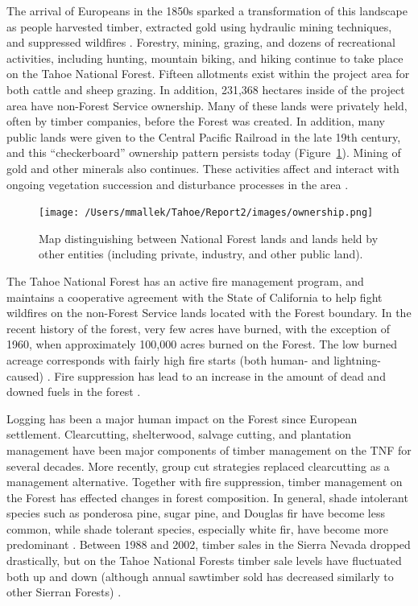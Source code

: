 The arrival of Europeans in the 1850s sparked a transformation of this landscape as people harvested timber, extracted gold using hydraulic mining techniques, and suppressed wildfires \citep{Storer1963}. Forestry, mining, grazing, and dozens of recreational activities, including hunting, mountain biking, and hiking continue to take place on the Tahoe National Forest. Fifteen allotments exist within the project area for both cattle and sheep grazing. In addition, 231,368 hectares inside of the project area have non-Forest Service ownership. Many of these lands were privately held, often by timber companies, before the Forest was created. In addition, many public lands were given to the Central Pacific Railroad in the late 19th century, and this ``checkerboard'' ownership pattern persists today (Figure~\ref{ownership}). Mining of gold and other minerals also continues. These activities affect and interact with ongoing vegetation succession and disturbance processes in the area \citep{USDAForestService2014}.

\begin{figure}[!htbp]
\centering
\texttt{[image: /Users/mmallek/Tahoe/Report2/images/ownership.png]}
\caption{Map distinguishing between National Forest lands and lands held by other entities (including private, industry, and other public land).} 
\label{ownership}
\end{figure}

The Tahoe National Forest has an active fire management program, and maintains a cooperative agreement with the State of California to help fight wildfires on the non-Forest Service lands located with the Forest boundary. In the recent history of the forest, very few acres have burned, with the exception of 1960, when approximately 100,000 acres burned on the Forest. The low burned acreage corresponds with fairly high fire starts (both human- and lightning-caused) \citep{USDAForestService1990}. Fire suppression has lead to an increase in the amount of dead and downed fuels in the forest \citep{USDAForestService2004}.

Logging has been a major human impact on the Forest since European settlement. Clearcutting, shelterwood, salvage cutting, and plantation management have been major components of timber management on the TNF for several decades. More recently, group cut strategies replaced clearcutting as a management alternative. Together with fire suppression, timber management on the Forest has effected changes in forest composition. In general, shade intolerant species such as ponderosa pine, sugar pine, and Douglas fir have become less common, while shade tolerant species, especially white fir, have become more predominant \citep{USDAForestService1990}. Between 1988 and 2002, timber sales in the Sierra Nevada dropped drastically, but on the Tahoe National Forests timber sale levels have fluctuated both up and down (although annual sawtimber sold has decreased similarly to other Sierran Forests) \citep{USDAForestService2004}.


